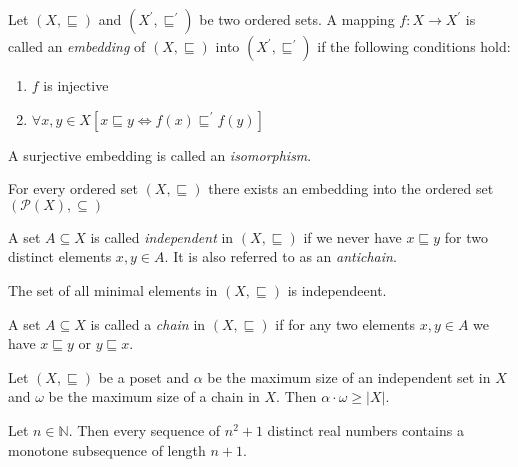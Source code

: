 \documentclass{classnotes}
\begin{document}
\begin{definition}[Embedding]
    Let $(X,\sqsubseteq)$ and $(X^\prime,\sqsubseteq^\prime)$ be two ordered sets. A mapping $f: X \to X^\prime$ is called an \emph{embedding}
    of $(X,\sqsubseteq)$ into $(X^\prime,\sqsubseteq^\prime)$ if the following conditions hold:
    \begin{enumerate}[label=(\roman*)]
        \item $f$ is injective
        \item $\forall x,y \in X [x \sqsubseteq y \iff f(x) \sqsubseteq^\prime f(y)]$
    \end{enumerate}
\end{definition}

\begin{definition}[Isomorhpism]
    A surjective embedding is called an \emph{isomorphism}.
\end{definition}

\begin{theorem}
    For every ordered set $(X,\sqsubseteq)$ there exists an embedding into the ordered set $(\mathcal P(X),\subseteq)$
\end{theorem}

\begin{definition}
    A set $A \subseteq X$ is called \emph{independent} in $(X, \sqsubseteq)$ if we never have $x \sqsubseteq y$ for two
    distinct elements $x,y \in A$. It is also referred to as an \emph{antichain}.
\end{definition}

\begin{remark}
    The set of all minimal elements in $(X,\sqsubseteq)$ is independeent.
\end{remark}

\begin{definition}
    A set $A \subseteq X$ is called a \emph{chain} in $(X,\sqsubseteq)$ if for any two elements $x,y \in A$ we have $x \sqsubseteq y$ or $y \sqsubseteq x$.
\end{definition}

\begin{theorem}
    Let $(X,\sqsubseteq)$ be a poset and $\alpha$ be the maximum size of an independent set in $X$ and $\omega$ be the maximum size of a chain in $X$. 
    Then $\alpha \cdot \omega \ge |X|$.
\end{theorem}

\begin{theorem}
    Let $n \in \mathbb N$. Then every sequence of $n^2+1$ distinct real numbers contains a monotone subsequence of length $n+1$.
\end{theorem}
\end{document}
